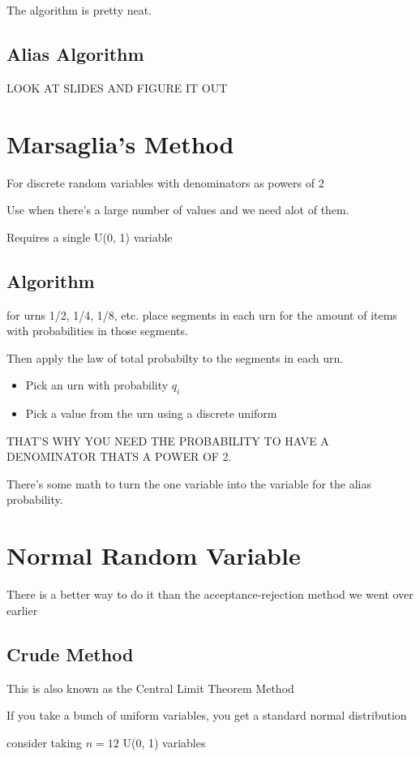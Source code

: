 \documentclass[fleqn]{report}
\begin{document}
The algorithm is pretty neat. 

\subsection{Alias Algorithm}
LOOK AT SLIDES AND FIGURE IT OUT 

\section{Marsaglia's Method}
For discrete random variables with denominators as powers of 2 

Use when there's a large number of values and we need alot of them. 

Requires a single U(0, 1) variable 

\subsection{Algorithm}
for urns 1/2, 1/4, 1/8, etc. place segments in each urn for the amount of items 
with probabilities in those segments. 

Then apply the law of total probabilty to the segments in each urn. 

\begin{itemize}
    \item 
    Pick an urn with probability $q_i$
    \item 
    Pick a value from the urn using a discrete uniform 
\end{itemize}
THAT'S WHY YOU NEED THE PROBABILITY TO HAVE A DENOMINATOR THATS A POWER 
OF 2. 

There's some math to turn the one variable into the variable for the alias 
probability. 

\section{Normal Random Variable}
There is a better way to do it than the acceptance-rejection method we went 
over earlier 

\subsection{Crude Method}
This is also known as the Central Limit Theorem Method 

If you take a bunch of uniform variables, you get a standard normal distribution 

consider taking $n=12$ U(0, 1) variables 
\end{document}
